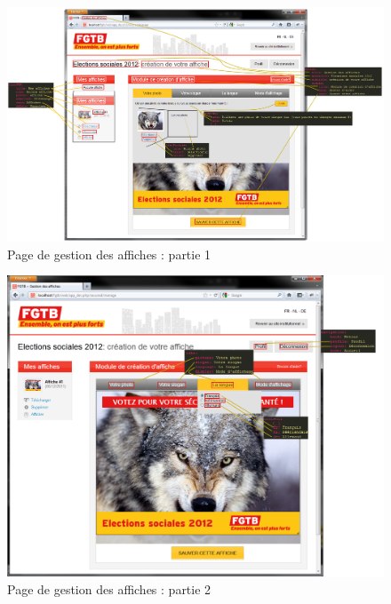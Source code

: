 \documentclass{article}
\begin{document}
\begin{sffamily}
\begin{figure}[!h]
\includegraphics[angle=-90,width=\textwidth]{messages_manage_step1.png}
\caption{Page de gestion des affiches : partie 1}
\end{figure}

\begin{figure}[!h]
\includegraphics[angle=-90,width=\textwidth]{messages_manage_step2.png}
\caption{Page de gestion des affiches : partie 2}
\end{figure}


\end{sffamily}
\end{document}

